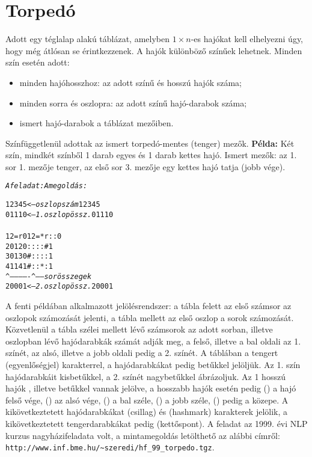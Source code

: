 \section{Torpedó}

Adott egy téglalap alakú táblázat, amelyben $1 \times n$-es hajókat kell elhelyezni
úgy, hogy még átlósan se érintkezzenek. A hajók különböző színűek lehetnek. Minden
szín esetén adott:
\begin{itemize}
\item minden hajóhosszhoz: az adott színű és hosszú hajók száma;
\item minden sorra és oszlopra: az adott színű hajó-darabok száma;
\item ismert hajó-darabok a táblázat mezőiben.
\end{itemize}
Színfüggetlenül adottak az ismert torpedó-mentes (tenger) mezők.
\br
{\bf Példa:} Két szín, mindkét színből 1 darab egyes és 1 darab kettes hajó.
Ismert mezők: az 1. sor 1. mezője tenger, az első sor 3. mezője egy kettes
hajó tatja (jobb vége).

\begin{alltt}
     {\rm \em A feladat:}                                     {\rm \em A megoldás:}
\end{alltt}
\begin{alltt}
      1 2 3 4 5     <-- {\em oszlopszám     }              1 2 3 4 5     
      0 1 1 1 0     <-- {\em 1. oszlopössz. }              0 1 1 1 0     
                        {\em                }                            
1  2  =   r      0      {\em                }        1  2  = * r : :  0
2  0             1      {\em                }        2  0  : : : : #  1  
3  0             1      {\em                }        3  0  # : : : :  1  
4  1             1      {\em                }        4  1  # : : * :  1  
   ^-------------^------{\em sorösszegek    }          
      2 0 0 0 1     <-- {\em 2. oszlopössz. }              2 0 0 0 1     
\end{alltt}

A fenti példában alkalmazott jelölésrendszer: a tábla felett az első számsor az
oszlopok számozását jelenti, a tábla mellett az első oszlop a sorok számozását.
Közvetlenül a tábla szélei mellett lévő számsorok az adott sorban, illetve oszlopban
lévő hajódarabkák számát adják meg, a felső, illetve a bal oldali az 1. színét,
az alsó, illetve a jobb oldali pedig a 2. színét. A táblában a tengert \cd{=}
(egyenlőségjel) karakterrel, a hajódarabkákat pedig betűkkel jelöljük. Az 1. szín
hajódarabkáit kisbetűkkel, a 2. színét nagybetűkkel ábrázoljuk. Az 1 hosszú hajók
, illetve  betűkkel vannak jelölve, a hosszabb hajók esetén pedig 
() a hajó felső vége,  () az alsó vége,  () a bal széle,
 () a jobb széle,  () pedig a közepe. A kikövetkeztetett
hajódarabkákat \cd{*} (csillag) és \cd{\#} (hashmark) karakterek jelölik, a
kikövetkeztetett tengerdarabkákat pedig \cd{:} (kettőspont).
\br
A feladat az 1999. évi NLP kurzus nagyházifeladata volt, a mintamegoldás letölthető
az alábbi címről: \verb'http://www.inf.bme.hu/~szeredi/hf_99_torpedo.tgz'.

